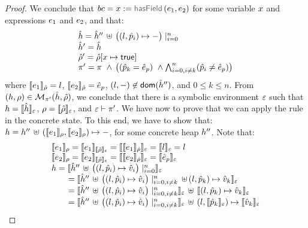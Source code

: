 \begin{proof}
\noindent{}
We conclude that  $\bcmd = \jvar := \hasfield(\jsilexpr_1, \jsilexpr_2)$ for some variable $\jvar$ and expressions $\jsilexpr_1$ and $\jsilexpr_2$, and that: 
$$
\begin{array}{l}
  \sheap =   \sheap'' \, \uplus \, \big((l, \sexprp_i) \mapsto -\big)\mid_{i = 0}^n     \\
  \sheap' =  \sheap \\
  \sstore' = \sstore[\jvar \mapsto \jtrue] \\ 
    \pc' = \pc \ \wedge \, \big( (\sexprp_k = \sexpr_p) \ \wedge \bigwedge_{i = 0, i \neq k}^n (\sexprp_i \neq \sexpr_p) \big)
\end{array}
$$ 
where $\symbeval{\jsilexpr_1}{\sstore} =  \loc$, $\symbeval{\jsilexpr_2}{\sstore} =  \sexpr_p$, 
$(\loc, -) \not\in \domain(\sheap'')$, and $0 \leq k \leq n$. 
%
From $(\heap, \store) \in \smodels{\sheap, \sstore}{\pc'}$, we conclude that there is a symbolic environment
$\senv$ such that $\heap = \semexpr{\sheap}{\senv}$, $\store = \semexpr{\sstore}{\senv}$, and 
$\senv \vdash \pc'$. 
We have now to prove that we can apply the  rule in the concrete state.
To this end, we have to show that:
$\heap = \heap'' \dunion (\symbeval{\jsilexpr_1}{\store}, \symbeval{\jsilexpr_2}{\store}) \mapsto -$, for 
some concrete heap $\heap''$. 
Note that: 
$$
\begin{array}{l}
%
 \symbeval{\jsilexpr_1}{\store} = \symbeval{\jsilexpr_1}{\symbeval{\sstore}{\senv}} = \symbeval{\symbeval{\jsilexpr_1}{\sstore}}{\senv} 
    = \symbeval{\loc}{\senv} = \loc \\ 
  \symbeval{\jsilexpr_2}{\store}  = \symbeval{\jsilexpr_2}{\semexpr{\sstore}{\senv}} =  \symbeval{\symbeval{\jsilexpr_2}{\sstore}}{\senv}
   =  \symbeval{\sexpr_p}{\senv} \\
 \heap = \semexpr{\sheap'' \, \uplus \, \big((l, \sexprp_i) \mapsto \sexprv_i\big)\mid_{i = 0}^n}{\senv} \\
    \qquad = \semexpr{\sheap'' \, \uplus \, \big((l, \sexprp_i) \mapsto \sexprv_i\big)\mid_{i = 0, i\neq k}^n \dunion (l, \sexprp_k) \mapsto \sexprv_k}{\senv} \\
    \qquad = \semexpr{\sheap'' \, \uplus \, \big((l, \sexprp_i) \mapsto \sexprv_i\big)\mid_{i = 0, i\neq k}^n}{\senv} \dunion \semexpr{(l, \sexprp_k) \mapsto \sexprv_k}{\senv} \\
    \qquad = \semexpr{\sheap'' \, \uplus \, \big((l, \sexprp_i) \mapsto \sexprv_i\big)\mid_{i = 0, i\neq k}^n}{\senv} \dunion (l, \semexpr{\sexprp_k}{\senv}) \mapsto \semexpr{\sexprv_k}{\senv} \\ 

\end{array}$$
\end{proof}
